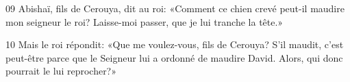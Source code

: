 
09 Abishaï, fils de Cerouya, dit au roi: «Comment ce chien crevé peut-il maudire mon seigneur le roi? Laisse-moi passer, que je lui tranche la tête.»

10 Mais le roi répondit: «Que me voulez-vous, fils de Cerouya? S’il maudit, c’est peut-être parce que le Seigneur lui a ordonné de maudire David. Alors, qui donc pourrait le lui reprocher?»
